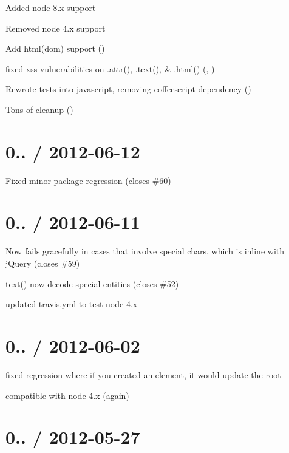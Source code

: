 \begin{DoxyItemize}
\item Added node 8.\+x support
\item Removed node 4.\+x support
\item Add html(dom) support ()
\item fixed xss vulnerabilities on .attr(), .text(), \& .html() (, )
\item Rewrote tests into javascript, removing coffeescript dependency ()
\item Tons of cleanup ()
\end{DoxyItemize}

\section*{0.. / 2012-\/06-\/12 }


\begin{DoxyItemize}
\item Fixed minor package regression (closes \#60)
\end{DoxyItemize}

\section*{0.. / 2012-\/06-\/11 }


\begin{DoxyItemize}
\item Now fails gracefully in cases that involve special chars, which is inline with j\+Query (closes \#59)
\item text() now decode special entities (closes \#52)
\item updated travis.\+yml to test node 4.\+x
\end{DoxyItemize}

\section*{0.. / 2012-\/06-\/02 }


\begin{DoxyItemize}
\item fixed regression where if you created an element, it would update the root
\item compatible with node 4.\+x (again)
\end{DoxyItemize}

\section*{0.. / 2012-\/05-\/27 }


